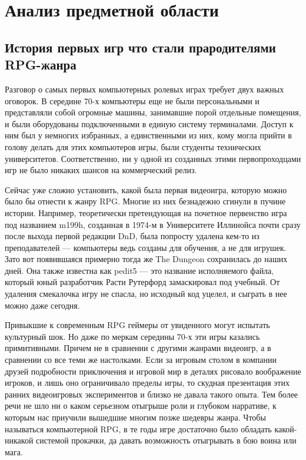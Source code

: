 \section{Анализ предметной области}
\subsection{История первых игр что стали прародителями RPG-жанра}

Разговор о самых первых компьютерных ролевых играх требует двух важных оговорок. В середине 70-х компьютеры еще не были персональными и представляли собой огромные машины, занимавшие порой отдельные помещения, и были оборудованы подключенными в единую систему терминалами. Доступ к ним был у немногих избранных, а единственными из них, кому могла прийти в голову делать для этих компьютеров игры, были студенты технических университетов. Соответственно, ни у одной из созданных этими первопроходцами игр не было никаких шансов на коммерческий релиз. 

Сейчас уже сложно установить, какой была первая видеоигра, которую можно было бы отнести к жанру RPG. Многие из них безнадежно сгинули в пучине истории. Например, теоретически претендующая на почетное первенство игра под названием m199h,  созданная в 1974-м в Университете Иллинойса почти сразу после выхода первой редакции DnD, была попросту удалена кем-то из преподавателей — компьютеры ведь созданы для обучения, а не для игрушек. Зато вот появившаяся примерно тогда же The Dungeon сохранилась до наших дней. Она также известна как pedit5 — это название исполняемого файла, который юный разработчик Расти Рутерфорд замаскировал под учебный. От удаления смекалочка игру не спасла, но исходный код уцелел, и сыграть в нее можно даже сегодня.

Привыкшие к современным RPG геймеры от увиденного могут испытать культурный шок. Но даже по меркам середины 70-х эти игры казались примитивными. Причем не в сравнении с другими жанрами видеоигр, а в сравнении со все теми же настолками. Если за игровым столом в компании друзей подробности приключения и игровой мир в деталях рисовало воображение игроков, и лишь оно ограничивало пределы игры, то скудная презентация этих ранних видеоигровых экспериментов и близко не давала такого опыта. Тем более речи не шло ни о каком серьезном отыгрыше роли и глубоком нарративе, к которым нас приучили вышедшие многим позже шедевры жанра. Чтобы называться компьютерной RPG, в те годы игре достаточно было обладать какой-никакой системой прокачки, да давать возможность отыгрывать в бою воина или мага.

